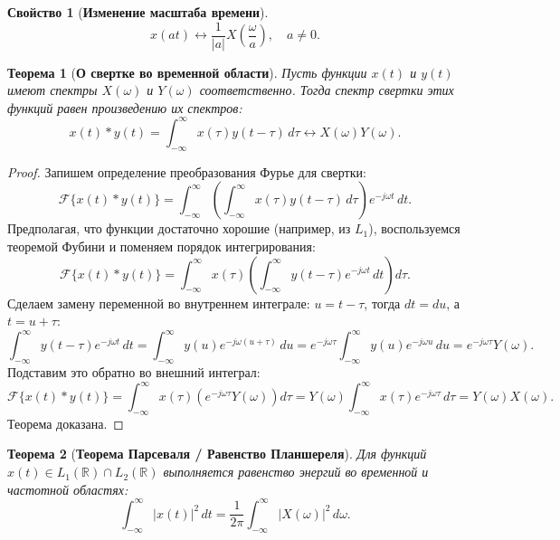 \documentclass[12pt,a4paper]{article}
\newtheorem{theorem}{Теорема}
\theoremstyle{definition}
\newtheorem{property}{Свойство}
\begin{document}
\begin{property}[\textbf{Изменение масштаба времени}]
$$ x(at) \leftrightarrow \frac{1}{|a|} X\left(\frac{\omega}{a}\right), \quad a \neq 0. $$
\end{property}

\begin{theorem}[\textbf{О свертке во временной области}]
Пусть функции $x(t)$ и $y(t)$ имеют спектры $X(\omega)$ и $Y(\omega)$ соответственно. Тогда спектр свертки этих функций равен произведению их спектров:
$$ x(t) * y(t) = \int_{-\infty}^{\infty} x(\tau) y(t - \tau) \, d\tau \leftrightarrow X(\omega)Y(\omega). $$
\end{theorem}

\begin{proof}
Запишем определение преобразования Фурье для свертки:
$$ \mathcal{F}\{x(t) * y(t)\} = \int_{-\infty}^{\infty} \left( \int_{-\infty}^{\infty} x(\tau) y(t - \tau) \, d\tau \right) e^{-j\omega t} \, dt. $$
Предполагая, что функции достаточно хорошие (например, из $L_1$), воспользуемся теоремой Фубини и поменяем порядок интегрирования:
$$ \mathcal{F}\{x(t) * y(t)\} = \int_{-\infty}^{\infty} x(\tau) \left( \int_{-\infty}^{\infty} y(t - \tau) e^{-j\omega t} \, dt \right) d\tau. $$
Сделаем замену переменной во внутреннем интеграле: $u = t - \tau$, тогда $dt = du$, а $t = u + \tau$:
$$ \int_{-\infty}^{\infty} y(t - \tau) e^{-j\omega t} \, dt = \int_{-\infty}^{\infty} y(u) e^{-j\omega (u + \tau)} \, du = e^{-j\omega \tau} \int_{-\infty}^{\infty} y(u) e^{-j\omega u} \, du = e^{-j\omega \tau} Y(\omega). $$
Подставим это обратно во внешний интеграл:
$$ \mathcal{F}\{x(t) * y(t)\} = \int_{-\infty}^{\infty} x(\tau) \left( e^{-j\omega \tau} Y(\omega) \right) d\tau = Y(\omega) \int_{-\infty}^{\infty} x(\tau) e^{-j\omega \tau} \, d\tau = Y(\omega) X(\omega). $$
Теорема доказана.
\end{proof}

\begin{theorem}[\textbf{Теорема Парсеваля / Равенство Планшереля}]
Для функций $x(t) \in L_1(\mathbb{R}) \cap L_2(\mathbb{R})$ выполняется равенство энергий во временной и частотной областях:
$$ \int_{-\infty}^{\infty} |x(t)|^2 \, dt = \frac{1}{2\pi} \int_{-\infty}^{\infty} |X(\omega)|^2 \, d\omega. $$
\end{theorem}
\end{document}

